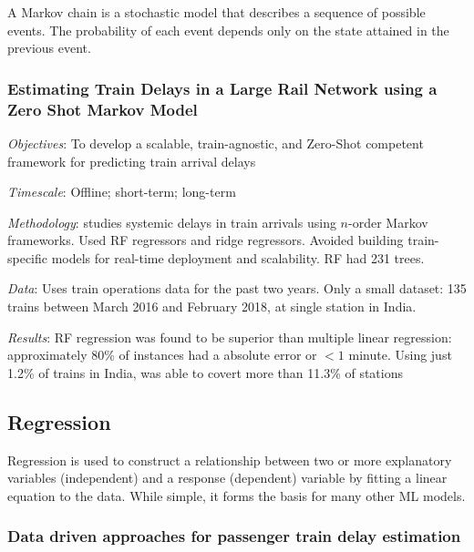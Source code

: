 \documentclass{article}
\begin{document}
A Markov chain is a stochastic model that describes a sequence of possible events. The probability of each event depends only on the state attained in the previous event.

\subsubsection{Estimating Train Delays in a Large Rail Network using a Zero Shot Markov Model \cite{gaurav_et_al_2018}}

\textit{Objectives}: To develop a scalable, train-agnostic, and Zero-Shot competent framework for predicting train arrival delays

\smallskip

\textit{Timescale}: Offline; short-term; long-term

\smallskip

\textit{Methodology}: studies systemic delays in train arrivals using $n$-order Markov frameworks. Used RF regressors and ridge regressors. Avoided building train-specific models for real-time deployment and scalability. RF had 231 trees.

\smallskip

\textit{Data}: Uses train operations data for the past two years. Only a small dataset: 135 trains between March 2016 and February 2018, at single station in India. 

\smallskip

\textit{Results}: RF regression was found to be superior than multiple linear regression: approximately 80\% of instances had a absolute error or $< 1$ minute. Using just 1.2\% of trains in India, was able to covert more than 11.3\% of stations

\subsection{Regression}

Regression is used to construct a relationship between two or more explanatory variables (independent) and a response (dependent) variable by fitting a linear equation to the data. While simple, it forms the basis for many other ML models.

\subsubsection{Data driven approaches for passenger train delay estimation \cite{wang_work_2015}}
\end{document}
